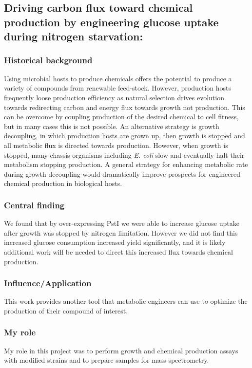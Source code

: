 \documentclass{article}
\begin{document}
\leavevmode\pagebreak


\newrefsection
\subsection{Driving carbon flux toward chemical production by engineering glucose uptake during nitrogen starvation:}
\subsubsection{Historical background}
Using microbial hosts to produce chemicals offers the potential to produce a variety of compounds from renewable feed-stock.
However, production hosts frequently loose production efficiency as natural selection drives evolution towards redirecting carbon and energy flux towards growth not production.
This can be overcome by coupling production of the desired chemical to cell fitness, but in many cases this is not possible.
An alternative strategy is growth decoupling, in which production hosts are grown up, then growth is stopped and all metabolic flux is directed towards production.
However, when growth is stopped, many chassis organisms including \textit{E. coli} slow and eventually halt their metabolism stopping production.
A general strategy for enhancing metabolic rate during growth decoupling would dramatically improve prospects for engineered chemical production in biological hosts.
%
\subsubsection{Central finding}
We found that by over-expressing PstI we were able to increase glucose uptake after growth was stopped by nitrogen limitation. 
However we did not find this increased glucose consumption increased yield significantly, and it is likely additional work will be needed to direct this increased flux towards chemical production.
%
\subsubsection{Influence/Application}
This work provides another tool that metabolic engineers can use to optimize the production of their compound of interest.
%
\subsubsection{My role}
My role in this project was to perform growth and chemical production assays with modified strains and to prepare samples for mass spectrometry.
%
\nocite{Chubukov2017-uu}
\printbibliography[heading=none]
\end{document}
